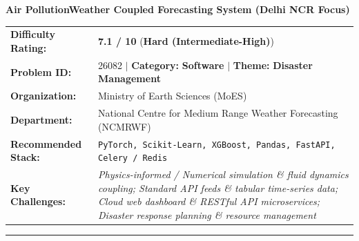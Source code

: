 \documentclass[10pt,a4paper]{article}
\begin{document}
\begin{tcolorbox}[pscard, title={"\textbf{SIH26082} \quad $\vert$ \quad Air PollutionWeather Coupled Forecasting System (Delhi NCR Focus)}]
\textbf{\large Air PollutionWeather Coupled Forecasting System (Delhi NCR Focus)}\\[0.25cm]

\begin{tabular}{@{}lp{12.5cm}@{}}
\textbf{Difficulty Rating:} & \textcolor{diffhard}{\textbf{\Large 7.1 / 10}} \quad (\textbf{Hard (Intermediate-High)}) \\
\textbf{Problem ID:} & 26082 \quad $\vert$ \quad \textbf{Category:} \textbf{Software} \quad $\vert$ \quad \textbf{Theme:} \textbf{Disaster Management} \\
\textbf{Organization:} & Ministry of Earth Sciences (MoES) \\
\textbf{Department:} & National Centre for Medium Range Weather Forecasting (NCMRWF) \\
\textbf{Recommended Stack:} & \texttt{PyTorch, Scikit-Learn, XGBoost, Pandas, FastAPI, Celery / Redis} \\
\textbf{Key Challenges:} & \textit{\small Physics-informed / Numerical simulation \& fluid dynamics coupling; Standard API feeds \& tabular time-series data; Cloud web dashboard \& RESTful API microservices; Disaster response planning \& resource management} \\
\end{tabular}

\vspace{0.2cm}
\hrule
\vspace{0.2cm}


\end{tcolorbox}
\end{document}
